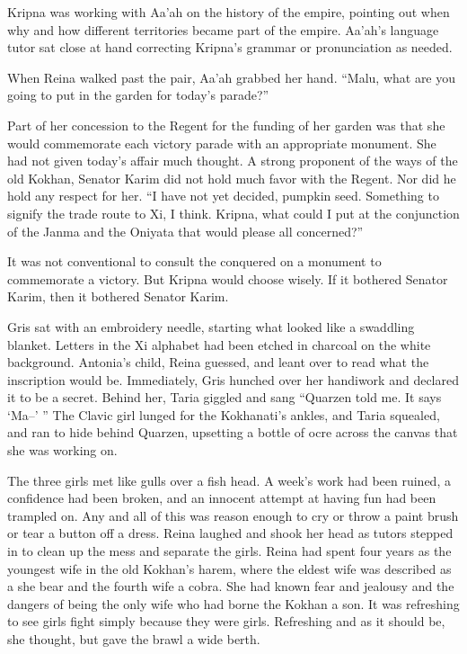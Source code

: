 \documentclass{article}
\begin{document}
	Kripna was working with Aa’ah on the history of the empire, pointing out when why and how different territories became part of the empire. Aa’ah’s language tutor sat close at hand correcting Kripna’s grammar or pronunciation as needed. 
	
	When Reina walked past the pair, Aa’ah grabbed her hand. “Malu, what are you going to put in the garden for today’s parade?” 
	
	Part of her concession to the Regent for the funding of her garden was that she would commemorate each victory parade with an appropriate monument. She had not given today’s affair much thought. A strong proponent of the ways of the old Kokhan, Senator Karim did not hold much favor with the Regent. Nor did he hold any respect for her. “I have not yet decided, pumpkin seed. Something to signify the trade route to Xi, I think. Kripna, what could I put at the conjunction of the Janma and the Oniyata that would please all concerned?”
	
	It was not conventional to consult the conquered on a monument to commemorate a victory. But Kripna would choose wisely. If it bothered Senator Karim, then it bothered Senator Karim.
	
	Gris sat with an embroidery needle, starting what looked like a swaddling blanket. Letters in the Xi alphabet had been etched in charcoal on the white background. Antonia’s child, Reina guessed, and leant over to read what the inscription would be. Immediately, Gris hunched over her handiwork and declared it to be a secret. Behind her, Taria giggled and sang “Quarzen told me. It says ‘Ma–’ ” The Clavic girl lunged for the Kokhanati’s ankles, and Taria squealed, and ran to hide behind Quarzen, upsetting a bottle of ocre across the canvas that she was working on. 
	
	The three girls met like gulls over a fish head. A week’s work had been ruined, a confidence had been broken, and an innocent attempt at having fun had been trampled on. Any and all of this was reason enough to cry or throw a paint brush or tear a button off a dress. Reina laughed and shook her head as tutors stepped in to clean up the mess and separate the girls. Reina had spent four years as the youngest wife in the old Kokhan’s harem, where the eldest wife was described as a she bear and the fourth wife a cobra. She had known fear and jealousy and the dangers of being the only wife who had borne the Kokhan a son. It was refreshing to see girls fight simply because they were girls. Refreshing and as it should be, she thought, but gave the brawl a wide berth.
	
\end{document}
